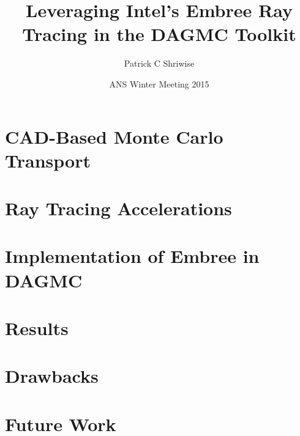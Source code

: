 \documentclass[12pt]{beamer}
\title{Leveraging Intel's Embree Ray Tracing in the DAGMC Toolkit}
\author{Patrick C Shriwise}
\institute{University of Wisconsin - Madison}
\date{ANS Winter Meeting 2015}
\begin{document}
\frame{\titlepage \addtocounter{framenumber}{-1}}


\begin{frame}
\frametitle{\null}
\tableofcontents
\end{frame}

\section{CAD-Based Monte Carlo Transport}

\section{Ray Tracing Accelerations}

\section{Implementation of Embree in DAGMC}

\section{Results}

\section{Drawbacks}

\section{Future Work}

\begin{frame}

\end{frame}
\end{document}
